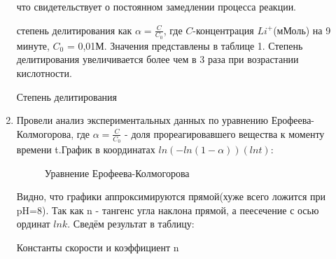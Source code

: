 \documentclass[a4paper,12pt]{article} %
\begin{document}
\begin{enumerate}
что свидетельствует о постоянном замедлении процесса реакции.\par 
{} степень делитирования как $\alpha = \frac{C}{C_0}$, где $C$-концентрация $Li^+$(мМоль) на 9 минуте, $C_0$ = 0,01М. Значения представлены в таблице 1. Степень делитирования увеличивается более чем в 3 раза при возрастании кислотности.

\begin{table}[H]
	\caption{\centering Степень делитирования }
    \label{tab:my table} 
    \end{table}

\item Провели анализ экспериментальных данных по уравнению Ерофеева-Колмогорова, где  $\alpha = \frac{C}{C_0}$ - доля прореагировавшего вещества к моменту времени t.График в координатах $ln(-ln(1-\alpha))(lnt):$
 \begin{figure}[H]
	\caption{\centering Уравнение Ерофеева-Колмогорова }
	\label{pic:5}
\end{figure}
Видно, что графики аппроксимируются прямой(хуже всего ложится при pH=8). Так как n - тангенс угла наклона прямой, а пеесечение с осью ординат $lnk$. Сведём результат в таблицу:
\begin{table}[H]
	\caption{\centering Константы скорости и коэффициент n }
    \label{tab:my table} 
    \end{table}


\end{enumerate}
\end{document}
